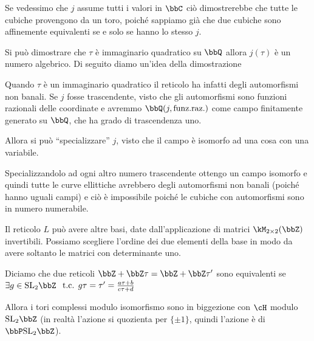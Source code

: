 \begin{osservazione}
  Se vedessimo che $j$ assume tutti i valori in $\bbC$ ciò dimostrerebbe
  che tutte le cubiche provengono da un toro, poiché sappiamo già che
  due cubiche sono affinemente equivalenti se e solo se hanno lo stesso $j$.
\end{osservazione}

\begin{divagazione}
  Si può dimostrare che $\tau$ è immaginario quadratico su $\bbQ$ allora
  $j(\tau)$ è un numero algebrico. Di seguito diamo un'idea della dimostrazione

  Quando $\tau$ è un immaginario quadratico il reticolo ha infatti degli
  automorfismi non banali. Se $j$ fosse trascendente, visto che gli
  automorfismi sono funzioni razionali delle coordinate e avremmo
  $\bbQ(j, \text{funz.raz.})$ come campo finitamente generato su $\bbQ$,
  che ha grado di trascendenza uno.

  Allora si può ``specializzare'' $j$, visto che il campo è isomorfo ad
  una cosa con una variabile.

  
  Specializzandolo ad ogni altro numero trascendente ottengo un campo
  isomorfo e quindi tutte le curve ellittiche avrebbero degli
  automorfismi non banali (poiché hanno uguali campi) e ciò è
  impossibile poiché le cubiche con automorfismi sono in numero
  numerabile.
\end{divagazione}

Il reticolo $L$ può avere altre basi, date dall'applicazione di matrici
$\kM_{2 \times 2} (\bbZ)$ invertibili. Possiamo scegliere l'ordine dei
due elementi della base in modo da avere soltanto le matrici con
determinante uno.

Diciamo che due reticoli $\bbZ + \bbZ \tau = \bbZ + \bbZ \tau'$ sono
equivalenti se $\exists g \in \SL_2 \bbZ$
$\text{ t.c. } g\tau = \tau' = \frac{a \tau + b}{c \tau + d}$

Allora i tori complessi modulo isomorfismo sono in biggezione con $\cH$
modulo $\SL_2 \bbZ$ (in realtà l'azione si quozienta per $\{\pm 1\}$,
quindi l'azione è di $\bbP\SL_2 \bbZ$).

